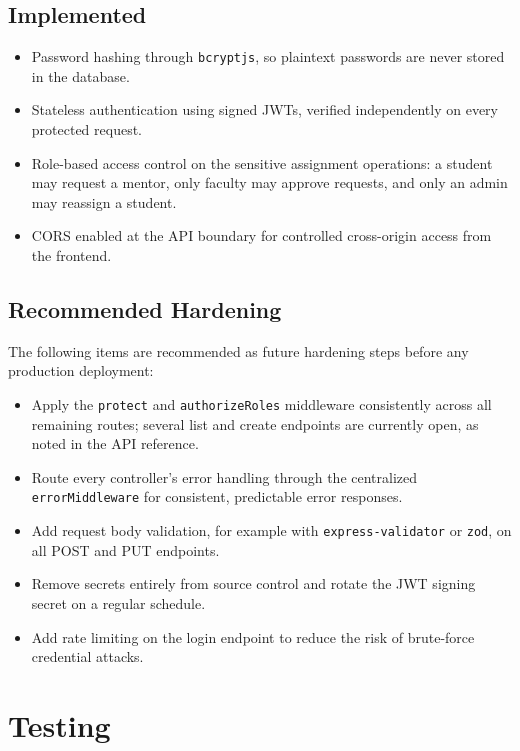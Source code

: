 \documentclass[12pt,a4paper]{report}
\newcommand{\sectionrule}{\vspace{-4pt}{\color{lightgray}\hrule height 1pt}\vspace{8pt}}
\begin{document}
\section{Implemented}
\sectionrule
\begin{itemize}[itemsep=2pt]
  \item Password hashing through \texttt{bcryptjs}, so plaintext passwords are never stored in the database.
  \item Stateless authentication using signed JWTs, verified independently on every protected request.
  \item Role-based access control on the sensitive assignment operations: a student may request a mentor, only faculty may approve requests, and only an admin may reassign a student.
  \item CORS enabled at the API boundary for controlled cross-origin access from the frontend.
\end{itemize}

\section{Recommended Hardening}
\sectionrule
The following items are recommended as future hardening steps before any production deployment:
\begin{itemize}[itemsep=2pt]
  \item Apply the \texttt{protect} and \texttt{authorizeRoles} middleware consistently across all remaining routes; several list and create endpoints are currently open, as noted in the API reference.
  \item Route every controller's error handling through the centralized \texttt{errorMiddleware} for consistent, predictable error responses.
  \item Add request body validation, for example with \texttt{express-validator} or \texttt{zod}, on all POST and PUT endpoints.
  \item Remove secrets entirely from source control and rotate the JWT signing secret on a regular schedule.
  \item Add rate limiting on the login endpoint to reduce the risk of brute-force credential attacks.
\end{itemize}

\chapter{Testing}
\end{document}
